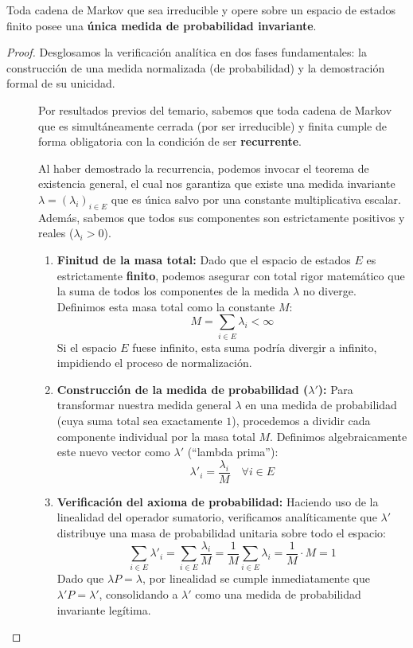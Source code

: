 \begin{coro}
    Toda cadena de Markov que sea irreducible y opere sobre un espacio de estados finito posee una \textbf{única medida de probabilidad invariante}.
\begin{proof}
    Desglosamos la verificación analítica en dos fases fundamentales: la construcción de una medida normalizada (de probabilidad) y la demostración formal de su unicidad.
    \begin{description}
        \item[] Por resultados previos del temario, sabemos que toda cadena de Markov que es simultáneamente cerrada (por ser irreducible) y finita cumple de forma obligatoria con la condición de ser \textbf{recurrente}.

    Al haber demostrado la recurrencia, podemos invocar el teorema de existencia general, el cual nos garantiza que existe una medida invariante $\lambda = (\lambda_i)_{i \in E}$ que es única salvo por una constante multiplicativa escalar. Además, sabemos que todos sus componentes son estrictamente positivos y reales ($\lambda_i > 0$).

    \begin{enumerate}
        \item \textbf{Finitud de la masa total:} 
        Dado que el espacio de estados $E$ es estrictamente \textbf{finito}, podemos asegurar con total rigor matemático que la suma de todos los componentes de la medida $\lambda$ no diverge. Definimos esta masa total como la constante $M$:
        \[
        M = \sum_{i \in E} \lambda_i < \infty
        \]
        Si el espacio $E$ fuese infinito, esta suma podría divergir a infinito, impidiendo el proceso de normalización.
        
        \item \textbf{Construcción de la medida de probabilidad ($\lambda'$):}
        Para transformar nuestra medida general $\lambda$ en una medida de probabilidad (cuya suma total sea exactamente $1$), procedemos a dividir cada componente individual por la masa total $M$. Definimos algebraicamente este nuevo vector como $\lambda'$ (``lambda prima''):
        \[
        \lambda'_i = \frac{\lambda_i}{M} \quad \forall i \in E
        \]
        
        \item \textbf{Verificación del axioma de probabilidad:}
        Haciendo uso de la linealidad del operador sumatorio, verificamos analíticamente que $\lambda'$ distribuye una masa de probabilidad unitaria sobre todo el espacio:
        \[
        \sum_{i \in E} \lambda'_i = \sum_{i \in E} \frac{\lambda_i}{M} = \frac{1}{M} \sum_{i \in E} \lambda_i = \frac{1}{M} \cdot M = 1
        \]
        Dado que $\lambda P = \lambda$, por linealidad se cumple inmediatamente que $\lambda' P = \lambda'$, consolidando a $\lambda'$ como una medida de probabilidad invariante legítima.
    \end{enumerate}


\end{description}
\end{proof}
\end{coro}
